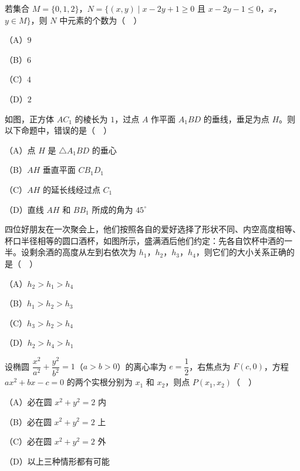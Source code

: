 \begin{question}
若集合 $M=\{0,1,2\}$，$N=\{(x,y)\mid x-2y+1\geqslant0$ 且 $x-2y-1\leqslant0$，$x$，$y\in M\}$，则 $N$ 中元素的个数为（　）

（A）$9$

（B）$6$

（C）$4$

（D）$2$

\Needspace{0.4\textheight}
\end{question}
\begin{question}
如图，正方体 $AC_1$ 的棱长为 $1$，过点 $A$ 作平面 $A_1BD$ 的垂线，垂足为点 $H$。则以下命题中，错误的是（　）
\nopagebreak[4]
\begin{center}\end{center}
\nopagebreak[4]
（A）点 $H$ 是 $\triangle A_1BD$ 的垂心

（B）$AH$ 垂直平面 $CB_1D_1$

（C）$AH$ 的延长线经过点 $C_1$

（D）直线 $AH$ 和 $BB_1$ 所成的角为 $45^\circ$

\Needspace{0.4\textheight}
\end{question}
\begin{question}
四位好朋友在一次聚会上，他们按照各自的爱好选择了形状不同、内空高度相等、杯口半径相等的圆口酒杯，如图所示，盛满酒后他们约定：先各自饮杯中酒的一半。设剩余酒的高度从左到右依次为 $h_1$，$h_2$，$h_3$，$h_4$，则它们的大小关系正确的是（　）
\nopagebreak[4]
\begin{center}\end{center}
\nopagebreak[4]
（A）$h_2>h_1>h_4$

（B）$h_1>h_2>h_3$

（C）$h_3>h_2>h_4$

（D）$h_2>h_4>h_1$

\end{question}
\begin{question}
设椭圆 $\dfrac{x^2}{a^2}+\dfrac{y^2}{b^2}=1$（$a>b>0$）的离心率为 $e=\dfrac12$，右焦点为 $F(c,0)$，方程 $ax^2+bx-c=0$ 的两个实根分别为 $x_1$ 和 $x_2$，则点 $P(x_1,x_2)$（　）

（A）必在圆 $x^2+y^2=2$ 内

（B）必在圆 $x^2+y^2=2$ 上

（C）必在圆 $x^2+y^2=2$ 外

（D）以上三种情形都有可能

\end{question}
